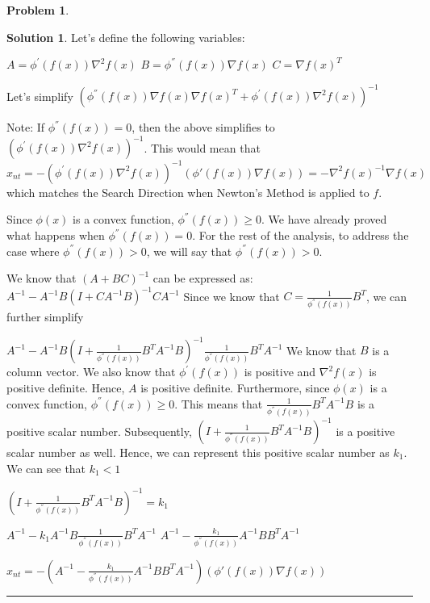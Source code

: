\documentclass{article}
\theoremstyle{definition}
\newtheorem{problem}{Problem}
\def\fline{\rule{0.75\linewidth}{0.5pt}}
\newcommand{\finishline}{\begin{center}\fline\end{center}}
\newtheorem*{solution*}{Solution}
\newenvironment{solution}{\begin{solution*}}{{\finishline} \end{solution*}}
\begin{document}
\begin{problem}
\begin{solution}
Let's define the following variables: 

$A = \phi^{'}(f(x))\nabla^2f(x)$ \newline 
$B = \phi^{''}(f(x))  \nabla f(x)$ \newline 
$C = \nabla f(x)^T$

Let's simplify $(\phi^{''}(f(x)) \nabla f(x) \nabla f(x)^T + \phi^{'}(f(x))\nabla^2f(x))^{-1}$ \newline 

Note: If $\phi^{''}(f(x)) = 0$, then the above simplifies to $(\phi^{'}(f(x))\nabla^2f(x))^{-1}$. This would mean that $x_{nt} = - (\phi^{'}(f(x))\nabla^2f(x))^{-1} ( \phi'(f(x)) \nabla f(x)) = -\nabla^2f(x)^{-1} \nabla f(x)$ which matches the Search Direction when Newton's Method is applied to $f$.

Since $\phi(x)$ is a convex function, $\phi^{''}(f(x)) \geq 0$. We have already proved what happens when $\phi^{''}(f(x)) = 0$. For the rest of the analysis, to address the case where $\phi^{''}(f(x)) > 0$, we will say that $\phi^{''}(f(x)) > 0$.

We know that $(A + BC)^{-1}$ can be expressed as: \newline 
$A^{-1} - A^{-1}B (I + CA^{-1}B)^{-1} CA^{-1}$ \newline 
Since we know that $C = \frac{1}{\phi^{''}(f(x))} B^T$, we can further simplify \newline

$A^{-1} - A^{-1}B (I + \frac{1}{\phi^{''}(f(x))} B^TA^{-1}B)^{-1} \frac{1}{\phi^{''}(f(x))} B^TA^{-1}$ \newline 
We know that $B$ is a column vector. We also know that $\phi^{'}(f(x))$ is positive and $\nabla^2f(x)$ is positive definite. Hence, $A$ is positive definite. Furthermore, since $\phi(x)$ is a convex function, $\phi^{''}(f(x)) \geq 0$. This means that $\frac{1}{\phi^{''}(f(x))} B^TA^{-1}B$ is a positive scalar number. Subsequently, $(I + \frac{1}{\phi^{''}(f(x))} B^TA^{-1}B)^{-1}$ is a positive scalar number as well. Hence, we can represent this positive scalar number as $k_1$. We can see that $k_1 < 1$

$(I + \frac{1}{\phi^{''}(f(x))} B^TA^{-1}B)^{-1} = k_1$

$A^{-1} - k_1 A^{-1}B \frac{1}{\phi^{''}(f(x))} B^TA^{-1}$ \newline 
$A^{-1} - \frac{k_1}{\phi^{''}(f(x))} A^{-1}B  B^TA^{-1}$ \newline 

$x_{nt} = -(A^{-1} - \frac{k_1}{\phi^{''}(f(x))} A^{-1}B  B^TA^{-1}) ( \phi'(f(x)) \nabla f(x))$


\end{solution}
\end{problem}
\end{document}
